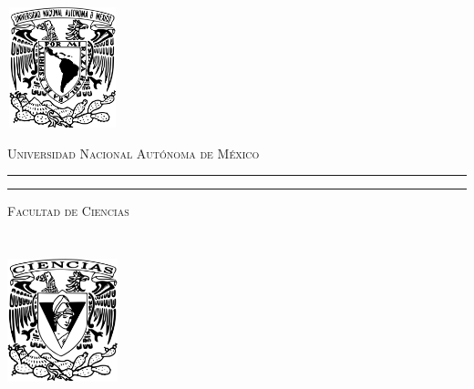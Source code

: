 \begin{titlepage}
	\thispagestyle{empty}
	\begin{minipage}[c][0.17\textheight][c]{0.21\textwidth}
		\begin{center}
			\includegraphics[width=3.2cm, height=3.5cm]{resources/Logo_UNAM.png}
		\end{center}
	\end{minipage}
	\begin{minipage}[c][0.195\textheight][t]{0.75\textwidth}
		\begin{center}
			\vspace{0.3cm}
			\textsc{\large Universidad Nacional Aut\'onoma de M\'exico}\\[0.5cm]
			\vspace{0.3cm}		
			\hrule height2.5pt
			\vspace{.2cm}
			\hrule height1pt
			\vspace{.8cm}
			\textsc{Facultad de Ciencias}\\[0.5cm] %
		\end{center}
	\end{minipage}
	
	\begin{minipage}[c][0.81\textheight][t]{0.21\textwidth}
		\vspace*{5mm}
		\begin{center}
			\hskip2.0mm
			\vrule width1pt height13cm 
			\vspace{5mm}
			\hskip2pt
			\vrule width2.5pt height13cm
			\hskip2mm
			\vrule width1pt height13cm \\
			\vspace{5mm}
			\includegraphics[height=4.0cm, width=3.2cm]{resources/Logo_FC.png}
		\end{center}
	\end{minipage}
	\begin{minipage}[c][0.81\textheight][t]{0.75\textwidth}
		\begin{center}
			\vspace{1cm}
			

\end{center}
\end{minipage}
\end{titlepage}
